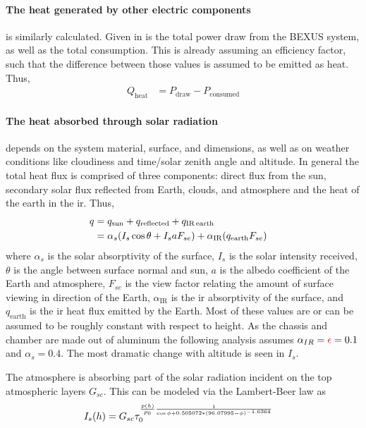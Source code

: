 \paragraph{The heat generated by other electric components} is similarly calculated. Given in  is the total power draw from the BEXUS system, as well as the total consumption. This is already assuming an efficiency factor, such that the difference between those values is assumed to be emitted as heat. Thus,
\begin{align}
     Q_\mathrm{heat} &= P_\mathrm{draw}- P_\mathrm{consumed}   
\end{align}

\paragraph{The heat absorbed through solar radiation} depends on the system material, surface, and dimensions, as well as on weather conditions like cloudiness and time/solar zenith angle and altitude. In general the total heat flux is comprised of three components: direct flux from the sun, secondary solar flux reflected from Earth, clouds, and atmosphere and the heat of the earth in the \gls{ir}. Thus,
\begin{align}
    q &= q_\mathrm{sun}+q_\mathrm{reflected}+q_\mathrm{IR\,earth}\\
    &=\alpha_s (I_s \cos{\theta}+ I_s a F_{se} ) + \alpha_\mathrm{IR}(q_\mathrm{earth} F_{se})\quad
\end{align}
where $\alpha_s$ is the solar absorptivity of the surface, $I_s$ is the solar intensity received, $\theta$ is the angle between surface normal and sun, $a$ is the albedo coefficient of the Earth and atmosphere, $F_{se}$ is the view factor relating the amount of surface viewing in direction of the Earth, $\alpha_\mathrm{IR}$ is the \gls{ir} absorptivity of the surface, and $q_\mathrm{earth}$ is the \gls{ir} heat flux emitted by the Earth. Most of these values are or can be assumed to be roughly constant with respect to height. As the chassis and chamber are made out of aluminum the following analysis assumes $\alpha_{IR}=\textcolor{red}{\epsilon}=0.1$ and $\alpha_s=0.4$.
The most dramatic change with altitude is seen in $I_s$.\par 
The atmosphere is absorbing part of the solar radiation incident on the top atmospheric layers $G_{sc}$. This can be modeled via the Lambert-Beer law as 
\begin{align}
    I_s(h) = G_{sc}\tau_0^{\frac{p(h)}{p_0}\frac{1}{\cos{\phi}+  0.505072 * (96.07995 - \phi) ^ {-1.6364}
}}\quad
\end{align}
